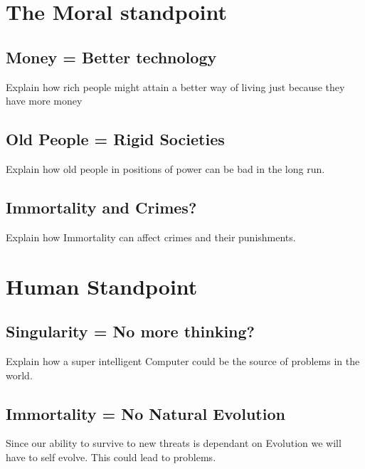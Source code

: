 \documentclass[
			12pt,
			a4paper,
			cleardoublepage=empty,
			final,
			twoside
				]{scrbook}
\begin{document}
  \section{The Moral standpoint}
    \subsection{Money = Better technology}
      \begin{par}

	      Explain how rich people might attain a better way of living just because they have more money

      \end{par}
    \subsection{Old People = Rigid Societies}
      \begin{par}

	      Explain how old people in positions of power can be bad in the long run.

      \end{par}
  \subsection{Immortality and Crimes?}
    \begin{par}

	    Explain how Immortality can affect crimes and their punishments.

    \end{par}
  \section{Human Standpoint}
    \subsection{Singularity = No more thinking?}
      \begin{par}

	      Explain how a super intelligent Computer could be the source of problems in the world.

      \end{par}
    \subsection{Immortality = No Natural Evolution}
      \begin{par}

	      Since our ability to survive to new threats is dependant on Evolution we will have to self evolve. This could lead to problems.
	
      \end{par}
\end{document}
